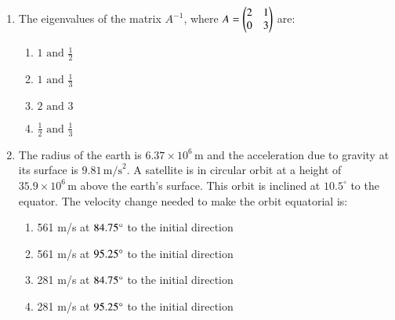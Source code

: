 \documentclass[journal]{IEEEtran}
\begin{document}
\begin{enumerate}[start=18]
\item  The eigenvalues of the matrix $A^{-1}$, where 
$ A = \begin{pmatrix}2 & 1 \\0 & 3\end{pmatrix}$
are:
\begin{multicols}{4}
\begin{enumerate}
\item $1 \text{ and } \frac{1}{2}$
\item $1 \text{ and } \frac{1}{3}$
\item $2 \text{ and } 3$
\item $\frac{1}{2} \text{ and } \frac{1}{3}$

\end{enumerate}
\end{multicols}

\item  The radius of the earth is $6.37 \times 10^6 \, \text{m}$ and the acceleration due to gravity at its surface is $9.81 \, \text{m/s}^2$. A satellite is in circular orbit at a height of $35.9 \times 10^6 \, \text{m}$ above the earth's surface. This orbit is inclined at $10.5^\circ$ to the equator. The velocity change needed to make the orbit equatorial is:
\begin{enumerate}
\item 561 m/s at $84.75\degree$ to the initial direction
\item 561 m/s at $95.25\degree$ to the initial direction
\item 281 m/s at $84.75\degree$ to the initial direction
\item 281 m/s at $95.25\degree$ to the initial direction
\end{enumerate}


\end{enumerate}
\end{document}
